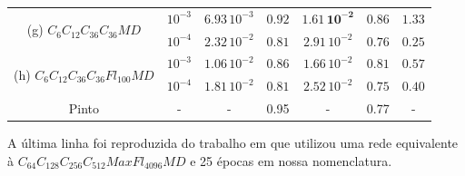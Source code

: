 \begin{table}[ht]
\begin{center}
\begin{tabular}{ |c|c|c|c|c|c|c| }
			\hline\hline
			\multirow{2}{*}{(g) $C_6C_{12}C_{36}C_{36}MD$}
			& $10^{-3}$ & $6.93\,10^{-3}$ & $0.92$ & $\mathbf{1.61\,10^{-2}}$ & $\mathbf{0.86}$ & $1.33$ \\ \cline{2-7}
			& $10^{-4}$ & $2.32\,10^{-2}$ & $0.81$ & $2.91\,10^{-2}$ & $0.76$ & $\mathbf{0.25}$ \\ \cline{2-7}
			
			\hline\hline
			\multirow{2}{*}{(h) $C_6C_{12}C_{36}C_{36}Fl_{100}MD$}
			& $10^{-3}$ & $1.06\,10^{-2}$ & $0.86$ & $1.66\,10^{-2}$ & $0.81$ & $0.57$ \\ \cline{2-7}
			& $10^{-4}$ & $1.81\,10^{-2}$ & $0.81$ & $2.52\,10^{-2}$ & $0.75$ & $0.40$ \\ \cline{2-7}
			\hline\hline
			Pinto\cite{otaro} & - & - & 0.95 & - & 0.77 &  - \\ \cline{2-7} \hline
		\end{tabular}\hfill%
	\end{center}
	\small A última linha foi reproduzida do trabalho em \cite{otaro} que utilizou uma rede equivalente à $C_{64}C_{128}C_{256}C_{512}MaxFl_{4096}MD$ e 25 épocas em nossa nomenclatura.
\end{table}

